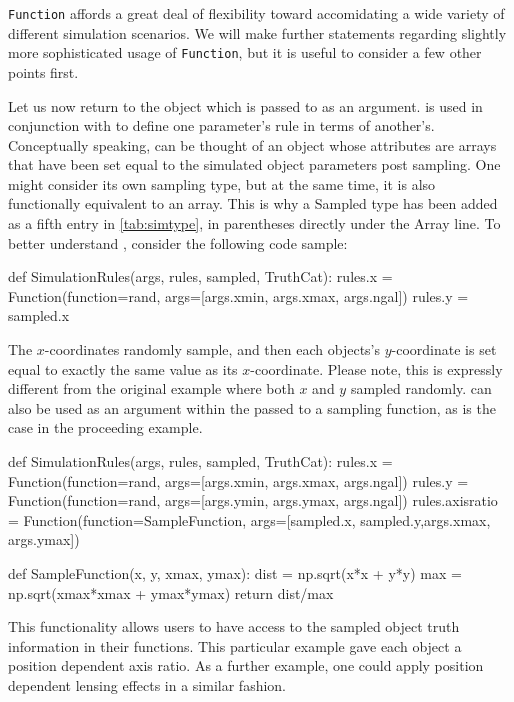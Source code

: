 \documentclass[11pt]{book}
\newcommand{\codett}[1]{\lstinline{#1}}
\begin{document}
\noindent \codett{Function} affords a great deal of flexibility toward accomidating  a wide variety of different simulation scenarios.
We will make further statements regarding slightly more sophisticated usage
of \codett{Function}, but it is useful to consider a few other points first.

Let us now return to the \simsamp{} object which is passed to \simfunc{} as an argument.
\simsamp{} is used in conjunction with \simrules{} to define one parameter's rule in terms of another's.
Conceptually speaking, \simsamp{} can be thought of an object whose attributes are arrays that 
have been set equal to the simulated object parameters post sampling.
One might consider \simsamp{} its own sampling type, but at the same time, it is also functionally equivalent to an array.
This is why a Sampled type has been added as a fifth entry in \autoref{tab:simtype}, in parentheses directly under the Array line.
To better understand \simsamp{}, consider the following code sample:

\begin{code}
def SimulationRules(args, rules, sampled, TruthCat):
    rules.x = Function(function=rand, args=[args.xmin, args.xmax, args.ngal])
    rules.y = sampled.x
\end{code}

\noindent The $x$-coordinates randomly sample, and then each objects's $y$-coordinate
is set equal to exactly the same value as its $x$-coordinate.
Please note, this is expressly different from the original example where both $x$ and $y$ sampled randomly.
\simsamp{} can also be used as an argument within the \simargs{} passed to a sampling function,
as is the case in the proceeding example.

\begin{code}
def SimulationRules(args, rules, sampled, TruthCat):
    rules.x = Function(function=rand, args=[args.xmin, args.xmax, args.ngal])
    rules.y = Function(function=rand, args=[args.ymin, args.ymax, args.ngal])
    rules.axisratio = Function(function=SampleFunction, args=[sampled.x, sampled.y,args.xmax, args.ymax])

def SampleFunction(x, y, xmax, ymax):
    dist = np.sqrt(x*x + y*y)
    max = np.sqrt(xmax*xmax + ymax*ymax)
    return dist/max
\end{code}

\noindent This functionality allows users to have access to the sampled object truth
information in their functions.
This particular example gave each object a position dependent axis ratio.
As a further example, one could apply position dependent lensing effects in a similar fashion.
\end{document}
